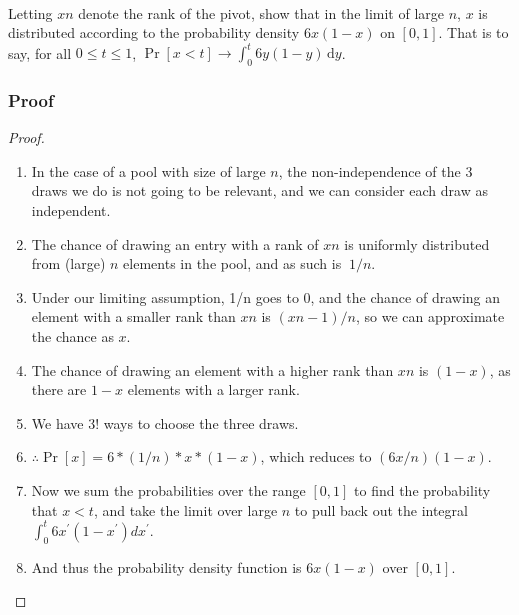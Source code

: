 \documentclass{article}
\begin{document}
\paragraph{\indent}
Letting \(xn\) denote the rank of the pivot, show that in the limit of large \(n\),
\(x\) is distributed according to the probability density \(6x(1 - x)\) on \([0, 1]\).
That is to say, for all \(0 \leq t \leq 1\),
\(\Pr[x < t] \rightarrow \int_0^t  6y(1-y) \, \mathrm{d}y\).

\subsubsection{Proof}
\begin{proof}
      \begin{enumerate}
            \item In the case of a pool with size of large \(n\), the non-independence of the 3 draws we
                  do is not going to be relevant, and we can consider each draw as
                  independent.
            \item The chance of drawing an entry with a rank of \(xn\) is uniformly
                  distributed from (large) \(n\) elements in the pool, and as such is \(~
                  1/n\).
            \item Under our limiting assumption, 1/n goes to 0, and the chance of drawing
                  an element with a smaller rank than \(xn\) is \((xn -1)/n\), so we can approximate
                  the chance as \(x\).
            \item The chance of drawing an element with a higher rank than \(xn\) is
                  \((1-x)\), as there are \(1-x\) elements with a larger rank.
            \item We have \(3! \) ways to choose the three draws.
            \item \( \therefore \Pr[x] = 6 * (1/n) * x * (1-x) \), which reduces to \(
                  (6x/n)(1-x) \).
            \item Now we sum the probabilities over the range \([0,1]\) to find the
                  probability that \(x < t\), and take the limit over large \(n\) to pull
                  back out the integral \( \int_0^t{6x^{\prime}(1-x^{\prime})
                  dx^{\prime}}\).
            \item And thus the probability density function is \(6x(1-x)\) over \([0,1]\).

      \end{enumerate}
\end{proof}
\end{document}
